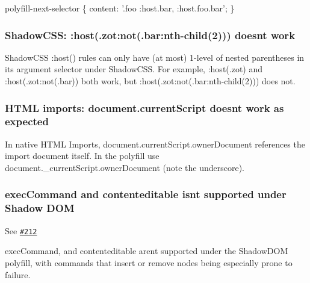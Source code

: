 \begin{DoxyCode}
polyfill-next-selector \{ content: '.foo :host.bar, :host.foo.bar'; \}
\end{DoxyCode}


\subsubsection*{Shadow\+C\+SS\+: \+:host(.zot\+:not(.bar\+:nth-\/child(2))) doesn\textquotesingle{}t work }

Shadow\+C\+SS {\ttfamily \+:host()} rules can only have (at most) 1-\/level of nested parentheses in its argument selector under Shadow\+C\+SS. For example, {\ttfamily \+:host(.zot)} and {\ttfamily \+:host(.zot\+:not(.bar))} both work, but {\ttfamily \+:host(.zot\+:not(.bar\+:nth-\/child(2)))} does not.

\subsubsection*{H\+T\+ML imports\+: document.\+current\+Script doesn\textquotesingle{}t work as expected }

In native H\+T\+ML Imports, document.\+current\+Script.\+owner\+Document references the import document itself. In the polyfill use document.\+\_\+current\+Script.\+owner\+Document (note the underscore).

\subsubsection*{exec\+Command and contenteditable isn\textquotesingle{}t supported under Shadow D\+OM }

See \href{https://github.com/webcomponents/webcomponentsjs/issues/212}{\tt \#212}

{\ttfamily exec\+Command}, and {\ttfamily contenteditable} aren\textquotesingle{}t supported under the Shadow\+D\+OM polyfill, with commands that insert or remove nodes being especially prone to failure. 
